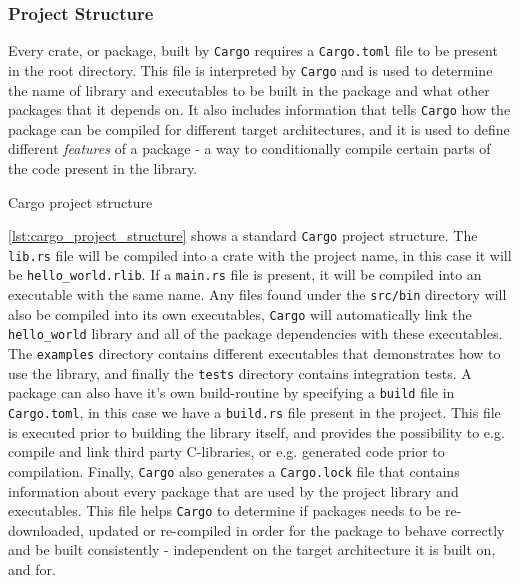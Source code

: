 \subsubsection{Project Structure}

Every crate, or package, built by \texttt{Cargo} requires a \texttt{Cargo.toml} file to be present in the root directory.
This file is interpreted by \texttt{Cargo} and is used to determine the name of library and executables to be built in the package and what other packages that it depends on.
It also includes information that tells \texttt{Cargo} how the package can be compiled for different target architectures, and it is used to define different \textit{features} of a package - a way to conditionally compile certain parts of the code present in the library.

\begin{listing}
\caption{Cargo project structure}
\label{lst:cargo_project_structure}
\end{listing}

\autoref{lst:cargo_project_structure} shows a standard \texttt{Cargo} project structure.
The \texttt{lib.rs} file will be compiled into a crate with the project name, in this case it will be \texttt{hello\_world.rlib}.
If a \texttt{main.rs} file is present, it will be compiled into an executable with the same name.
Any files found under the \texttt{src/bin} directory will also be compiled into its own executables, \texttt{Cargo} will automatically link the \texttt{hello\_world} library and all of the package dependencies with these executables.
The \texttt{examples} directory contains different executables that demonstrates how to use the library, and finally the \texttt{tests} directory contains integration tests.
A package can also have it's own build-routine by specifying a \texttt{build} file in \texttt{Cargo.toml}, in this case we have a \texttt{build.rs} file present in the project.
This file is executed prior to building the library itself, and provides the possibility to e.g. compile and link third party C-libraries, or e.g. generated code prior to compilation.
Finally, \texttt{Cargo} also generates a \texttt{Cargo.lock} file that contains information about every package that are used by the project library and executables.
This file helps \texttt{Cargo} to determine if packages needs to be re-downloaded, updated or re-compiled in order for the package to behave correctly and be built consistently - independent on the target architecture it is built on, and for.

